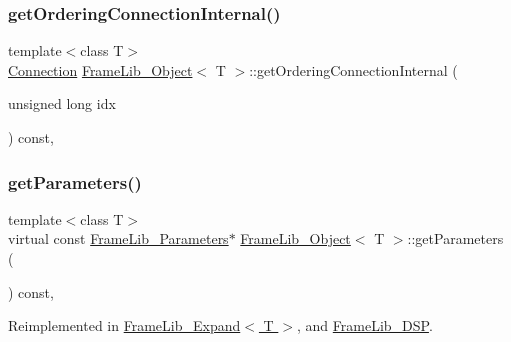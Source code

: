 \mbox{\label{class_frame_lib___object_ac6075f11200b91f9a133344190a64dc4}} 
\subsubsection{\texorpdfstring{get\+Ordering\+Connection\+Internal()}{getOrderingConnectionInternal()}}
{\footnotesize\ttfamily template$<$class T$>$ \\
\hyperlink{struct_frame_lib___object_1_1_connection}{Connection} \hyperlink{class_frame_lib___object}{Frame\+Lib\+\_\+\+Object}$<$ T $>$\+::get\+Ordering\+Connection\+Internal (\begin{DoxyParamCaption}\item[{unsigned long}]{idx }\end{DoxyParamCaption}) const\hspace{0.3cm}{\ttfamily [inline]}, {\ttfamily [protected]}}

\mbox{\label{class_frame_lib___object_ac90a6770aeef26ee1601889dc16dba56}} 
\subsubsection{\texorpdfstring{get\+Parameters()}{getParameters()}}
{\footnotesize\ttfamily template$<$class T$>$ \\
virtual const \hyperlink{class_frame_lib___parameters}{Frame\+Lib\+\_\+\+Parameters}$\ast$ \hyperlink{class_frame_lib___object}{Frame\+Lib\+\_\+\+Object}$<$ T $>$\+::get\+Parameters (\begin{DoxyParamCaption}{ }\end{DoxyParamCaption}) const\hspace{0.3cm}{\ttfamily [inline]}, {\ttfamily [virtual]}}



Reimplemented in \hyperlink{class_frame_lib___expand_a7fed62e92c707d454fa49ce10dee39ff}{Frame\+Lib\+\_\+\+Expand$<$ T $>$}, and \hyperlink{class_frame_lib___d_s_p_ab1b692f7fe4340b7837319ceed334f02}{Frame\+Lib\+\_\+\+D\+SP}.

